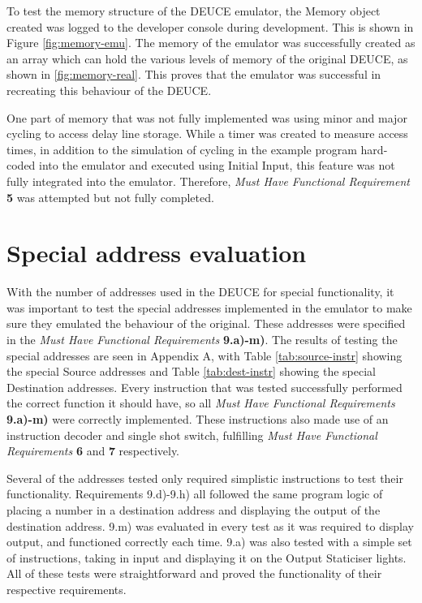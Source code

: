 \documentclass{l4proj}
\begin{document}
To test the memory structure of the DEUCE emulator, the Memory object created was logged to the developer console during development. This is shown in Figure \ref{fig:memory-emu}. The memory of the emulator was successfully created as an array which can hold the various levels of memory of the original DEUCE, as shown in \ref{fig:memory-real}. This proves that the emulator was successful in recreating this behaviour of the DEUCE.

One part of memory that was not fully implemented was using minor and major cycling to access delay line storage. While a timer was created to measure access times, in addition to the simulation of cycling in the example program hard-coded into the emulator and executed using Initial Input, this feature was not fully integrated into the emulator. Therefore, \textit{Must Have Functional Requirement} \textbf{5} was attempted but not fully completed.

\section{Special address evaluation}
With the number of addresses used in the DEUCE for special functionality, it was important to test the special addresses implemented in the emulator to make sure they emulated the behaviour of the original. These addresses were specified in the \textit{Must Have Functional Requirements} \textbf{9.a)-m)}. The results of testing the special addresses are seen in Appendix A, with Table \ref{tab:source-instr} showing the special Source addresses and Table \ref{tab:dest-instr} showing the special Destination addresses. Every instruction that was tested successfully performed the correct function it should have, so all \textit{Must Have Functional Requirements} \textbf{9.a)-m)} were correctly implemented. These instructions also made use of an instruction decoder and single shot switch, fulfilling \textit{Must Have Functional Requirements} \textbf{6} and \textbf{7} respectively.

Several of the addresses tested only required simplistic instructions to test their functionality. Requirements 9.d)-9.h) all followed the same program logic of placing a number in a destination address and displaying the output of the destination address. 9.m) was evaluated in every test as it was required to display output, and functioned correctly each time. 9.a) was also tested with a simple set of instructions, taking in input and displaying it on the Output Staticiser lights. All of these tests were straightforward and proved the functionality of their respective requirements.
\end{document}
